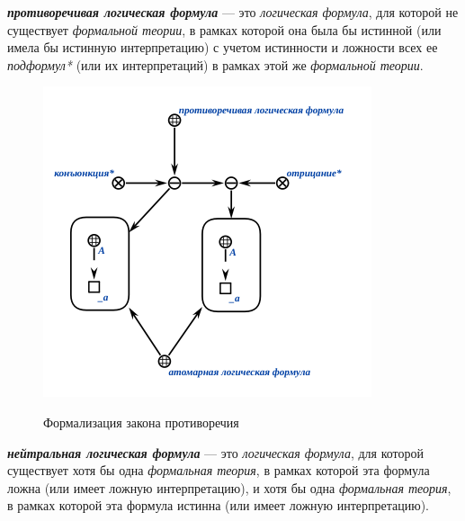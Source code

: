 \begin{SCn}
\end{SCn}
\textbf{\textit{противоречивая логическая формула}} --- это \textit{логическая формула}, для которой не существует \textit{формальной теории}, в рамках которой она была бы истинной (или имела бы истинную интерпретацию) с учетом истинности и ложности всех ее \textit{подформул*} (или их интерпретаций) в рамках этой же \textit{формальной теории}.

\begin{figure}[H]
	\caption{Формализация закона противоречия}
	\includegraphics[scale=0.8]{author/part2/figures/logic/contradiction_formula.png}
	\label{fig:contradiction_formula}
\end{figure}

\begin{SCn}
\end{SCn}

\textbf{\textit{нейтральная логическая формула}} --- это \textit{логическая формула}, для которой существует хотя бы одна \textit{формальная теория}, в рамках которой эта формула ложна (или имеет ложную интерпретацию), и хотя бы одна \textit{формальная теория}, в рамках которой эта формула истинна (или имеет ложную интерпретацию).

